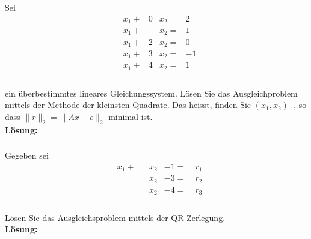 \subsubsection{} %
Sei 
\[\begin{aligned}
 &x_1 +& 0&x_2 =& 2\\
 &x_1 +&  &x_2 =& 1\\
 &x_1 +& 2&x_2 =& 0\\
 &x_1 +& 3&x_2 =& -1\\
 &x_1 +& 4&x_2 =& 1\\
\end{aligned}\] \\
ein überbestimmtes lineares Gleichungssystem. Lösen Sie das Ausgleichproblem mittels der Methode der kleinsten Quadrate. Das heisst, finden Sie $(x_1,x_2)^\top$, so dass $\|r\|_2 = \|Ax-c\|_2$ minimal ist.\\

\noindent \textbf{Lösung:}

\newpage
\subsubsection{}
Gegeben sei
\[\begin{aligned}
 &x_1 +&  &x_2 &- 1 =&\; r_1\\
 &     &  &x_2 &- 3 =&\; r_2\\
 &     &  &x_2 &- 4 =&\; r_3\\
\end{aligned}\] \\
Lösen Sie das Ausgleichsproblem mittels der QR-Zerlegung. \\

\noindent \textbf{Lösung:}